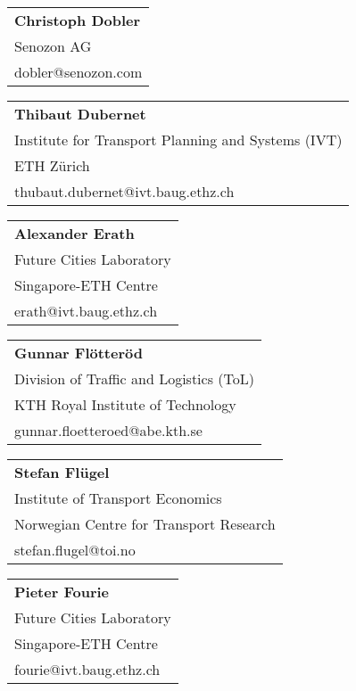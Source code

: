\begin{tabular}[width=0.48\textwidth]{l}
\textbf{Christoph Dobler} \\
Senozon AG \\
dobler@senozon.com \\
\end{tabular}

\begin{tabular}[width=0.48\textwidth]{l}
\textbf{Thibaut Dubernet} \\
Institute for Transport Planning and Systems (IVT) \\
ETH Zürich \\
thubaut.dubernet@ivt.baug.ethz.ch \\
\end{tabular}

\begin{tabular}[width=0.48\textwidth]{l}
\textbf{Alexander Erath} \\
Future Cities Laboratory \\
Singapore-ETH Centre\\
erath@ivt.baug.ethz.ch \\
\end{tabular}

\begin{tabular}[width=0.48\textwidth]{l}
\textbf{Gunnar Flötteröd} \\
Division of Traffic and Logistics (ToL) \\
KTH Royal Institute of Technology \\
gunnar.floetteroed@abe.kth.se \\
\end{tabular}

\begin{tabular}[width=0.48\textwidth]{l}
\textbf{Stefan Flügel} \\
Institute of Transport Economics \\
Norwegian Centre for Transport Research \\
stefan.flugel@toi.no \\
\end{tabular}

\begin{tabular}[width=0.48\textwidth]{l}
\textbf{Pieter Fourie} \\
Future Cities Laboratory \\
Singapore-ETH Centre\\
fourie@ivt.baug.ethz.ch \\
\end{tabular}

